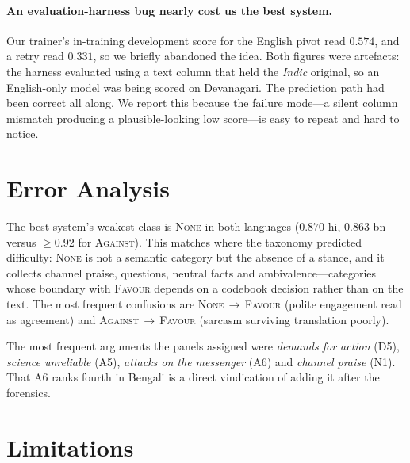 \documentclass[twocolumn]{ceurart}
\begin{document}
\paragraph{An evaluation-harness bug nearly cost us the best system.}
Our trainer's in-training development score for the English pivot read $0.574$,
and a retry read $0.331$, so we briefly abandoned the idea. Both figures were
artefacts: the harness evaluated using a text column that held the \emph{Indic}
original, so an English-only model was being scored on Devanagari. The
prediction path had been correct all along. We report this because the failure
mode---a silent column mismatch producing a plausible-looking low score---is
easy to repeat and hard to notice.

\section{Error Analysis}

The best system's weakest class is \textsc{None} in both languages
($0.870$ hi, $0.863$ bn versus $\geq 0.92$ for \textsc{Against}). This matches
where the taxonomy predicted difficulty: \textsc{None} is not a semantic
category but the absence of a stance, and it collects channel praise,
questions, neutral facts and ambivalence---categories whose boundary with
\textsc{Favour} depends on a codebook decision rather than on the text. The
most frequent confusions are \textsc{None}\,$\rightarrow$\,\textsc{Favour}
(polite engagement read as agreement) and
\textsc{Against}\,$\rightarrow$\,\textsc{Favour} (sarcasm surviving translation
poorly).

The most frequent arguments the panels assigned were
\emph{demands for action} (D5), \emph{science unreliable} (A5),
\emph{attacks on the messenger} (A6) and \emph{channel praise} (N1). That A6
ranks fourth in Bengali is a direct vindication of adding it after the
forensics.

\section{Limitations}
\label{sec:limitations}
\end{document}
